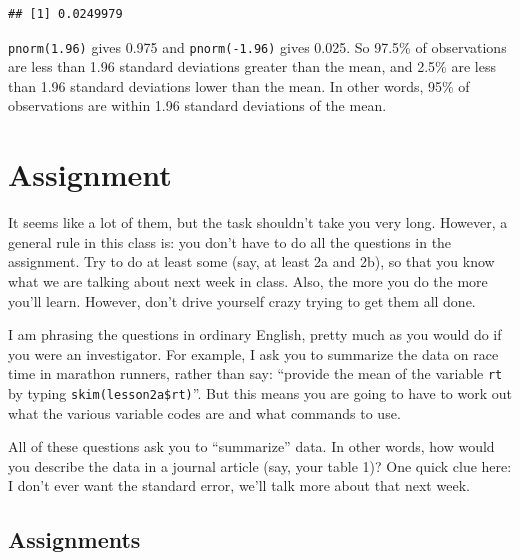 \documentclass[]{book}
\begin{document}
\begin{verbatim}
## [1] 0.0249979
\end{verbatim}

\texttt{pnorm(1.96)} gives 0.975 and \texttt{pnorm(-1.96)} gives 0.025.
So 97.5\% of observations are less than 1.96 standard deviations greater
than the mean, and 2.5\% are less than 1.96 standard deviations lower
than the mean. In other words, 95\% of observations are within 1.96
standard deviations of the mean.

\hypertarget{assignment}{%
\section{Assignment}\label{assignment}}

It seems like a lot of them, but the task shouldn't take you very long.
However, a general rule in this class is: you don't have to do all the
questions in the assignment. Try to do at least some (say, at least 2a
and 2b), so that you know what we are talking about next week in class.
Also, the more you do the more you'll learn. However, don't drive
yourself crazy trying to get them all done.

I am phrasing the questions in ordinary English, pretty much as you
would do if you were an investigator. For example, I ask you to
summarize the data on race time in marathon runners, rather than say:
``provide the mean of the variable \texttt{rt} by typing
\texttt{skim(lesson2a\$rt)}''. But this means you are going to have to
work out what the various variable codes are and what commands to use.

All of these questions ask you to ``summarize'' data. In other words,
how would you describe the data in a journal article (say, your table
1)? One quick clue here: I don't ever want the standard error, we'll
talk more about that next week.

\hypertarget{assignments-1}{%
\subsection{Assignments}\label{assignments-1}}
\end{document}
